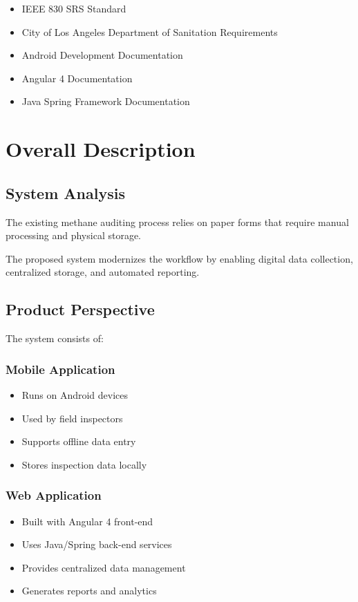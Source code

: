 \documentclass[12pt]{article}
\begin{document}
\begin{itemize}
\item IEEE 830 SRS Standard
\item City of Los Angeles Department of Sanitation Requirements
\item Android Development Documentation
\item Angular 4 Documentation
\item Java Spring Framework Documentation
\end{itemize}

\section{Overall Description}

\subsection{System Analysis}

The existing methane auditing process relies on paper forms that require manual processing and physical storage.

The proposed system modernizes the workflow by enabling digital data collection, centralized storage, and automated reporting.

\subsection{Product Perspective}

The system consists of:

\subsubsection*{Mobile Application}

\begin{itemize}
\item Runs on Android devices
\item Used by field inspectors
\item Supports offline data entry
\item Stores inspection data locally
\end{itemize}

\subsubsection*{Web Application}

\begin{itemize}
\item Built with Angular 4 front-end
\item Uses Java/Spring back-end services
\item Provides centralized data management
\item Generates reports and analytics
\end{itemize}
\end{document}

